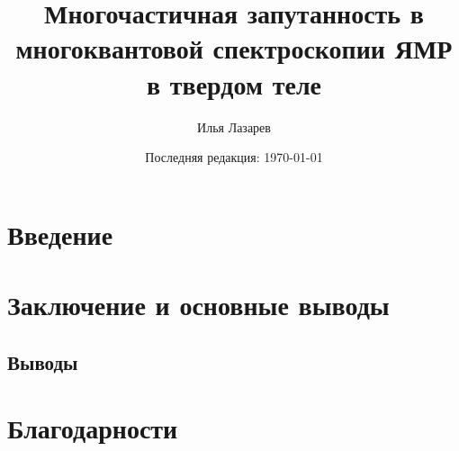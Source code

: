 \documentclass[14pt]{extreport}
\title{Многочастичная запутанность в многоквантовой спектроскопии ЯМР в твердом теле}
\author{Илья Лазарев}
\date{Последняя редакция: \today}
\begin{document}
\addtocounter{page}{1}
\tableofcontents
\chapter*{Введение}






\chapter*{Заключение и основные выводы}

\section*{Выводы}
\begin{enumerate}
  
\end{enumerate}
\chapter*{Благодарности}




\end{document}
